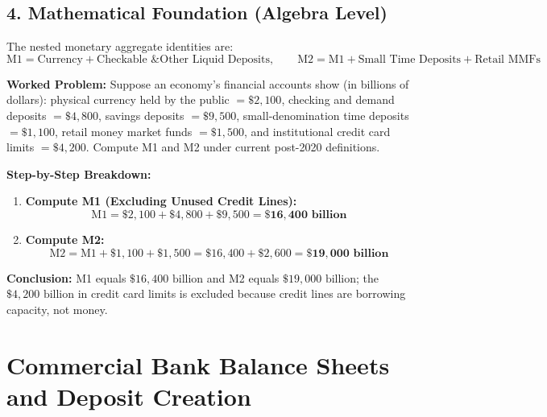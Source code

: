 \documentclass[11pt,letterpaper]{article}
\begin{document}
\subsection*{4. Mathematical Foundation (Algebra Level)}
The nested monetary aggregate identities are:
\begin{equation}
\text{M1} = \text{Currency} + \text{Checkable \& Other Liquid Deposits}, \qquad \text{M2} = \text{M1} + \text{Small Time Deposits} + \text{Retail MMFs}
\end{equation}

\noindent\textbf{Worked Problem:}
Suppose an economy's financial accounts show (in billions of dollars): physical currency held by the public $= \$2{,}100$, checking and demand deposits $= \$4{,}800$, savings deposits $= \$9{,}500$, small-denomination time deposits $= \$1{,}100$, retail money market funds $= \$1{,}500$, and institutional credit card limits $= \$4{,}200$. Compute M1 and M2 under current post-2020 definitions.

\noindent\textbf{Step-by-Step Breakdown:}
\begin{enumerate}
    \item \textbf{Compute M1 (Excluding Unused Credit Lines):}
    \[
    \text{M1} = \$2{,}100 + \$4{,}800 + \$9{,}500 = \mathbf{\$16{,}400\text{ billion}}
    \]

    \item \textbf{Compute M2:}
    \[
    \text{M2} = \text{M1} + \$1{,}100 + \$1{,}500 = \$16{,}400 + \$2{,}600 = \mathbf{\$19{,}000\text{ billion}}
    \]
\end{enumerate}
\textbf{Conclusion:} M1 equals $\$16{,}400\text{ billion}$ and M2 equals $\$19{,}000\text{ billion}$; the $\$4{,}200\text{ billion}$ in credit card limits is excluded because credit lines are borrowing capacity, not money.

\section{Commercial Bank Balance Sheets and Deposit Creation}
\end{document}
